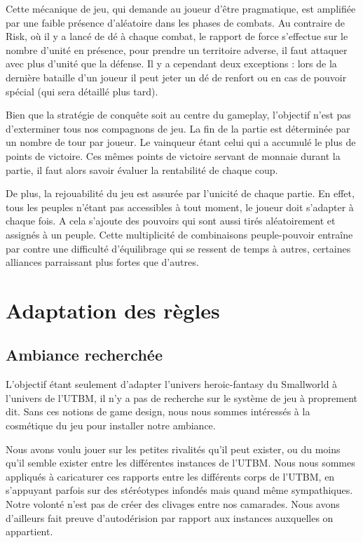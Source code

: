\documentclass[11pt]{report}
\begin{document}
		Cette mécanique de jeu, qui demande au joueur d'être pragmatique, est amplifiée par une faible présence d'aléatoire dans les phases de combats. Au contraire de Risk\up{\copyright}, où il y a lancé de dé à chaque combat, le rapport de force s'effectue sur le nombre d'unité en présence, pour prendre un territoire adverse, il faut attaquer avec plus d'unité que la défense. Il y a cependant deux exceptions : lors de la dernière bataille d'un joueur il peut jeter un dé de renfort ou en cas de pouvoir spécial (qui sera détaillé plus tard).
		
		Bien que la stratégie de conquête soit au centre du gameplay, l'objectif n'est pas d'exterminer tous nos compagnons de jeu. La fin de la partie est déterminée par un nombre de tour par joueur. Le vainqueur étant celui qui a accumulé le plus de points de victoire. Ces mêmes points de victoire servant de monnaie durant la partie, il faut alors savoir évaluer la rentabilité de chaque coup. 
		
		De plus, la rejouabilité du jeu est assurée par l'unicité de chaque partie. En effet, tous les peuples n'étant pas accessibles à tout moment, le joueur doit s'adapter à chaque fois. A cela s'ajoute des pouvoirs qui sont aussi tirés aléatoirement et assignés à un peuple. Cette multiplicité de combinaisons peuple-pouvoir entraîne par contre une difficulté d'équilibrage qui se ressent de temps à autres, certaines alliances parraissant plus fortes que d'autres.

\chapter{Adaptation des règles}

	\section{Ambiance recherchée}
	
	L'objectif étant seulement d'adapter l'univers heroic-fantasy du Smallworld\up{\copyright} à l'univers de l'UTBM, il n'y a pas de recherche sur le système de jeu à proprement dit. Sans ces notions de game design, nous nous sommes intéressés à la cosmétique du jeu pour installer notre ambiance. 
	
	Nous avons voulu jouer sur les petites rivalités qu'il peut exister, ou du moins qu'il semble exister entre les différentes instances de l'UTBM. Nous nous sommes appliqués à caricaturer ces rapports entre les différents corps de l'UTBM, en s'appuyant parfois sur des stéréotypes infondés mais quand même sympathiques. Notre volonté n'est pas de créer des clivages entre nos camarades. Nous avons d'ailleurs fait preuve d'autodérision par rapport aux instances auxquelles on appartient. 
	
\end{document}

